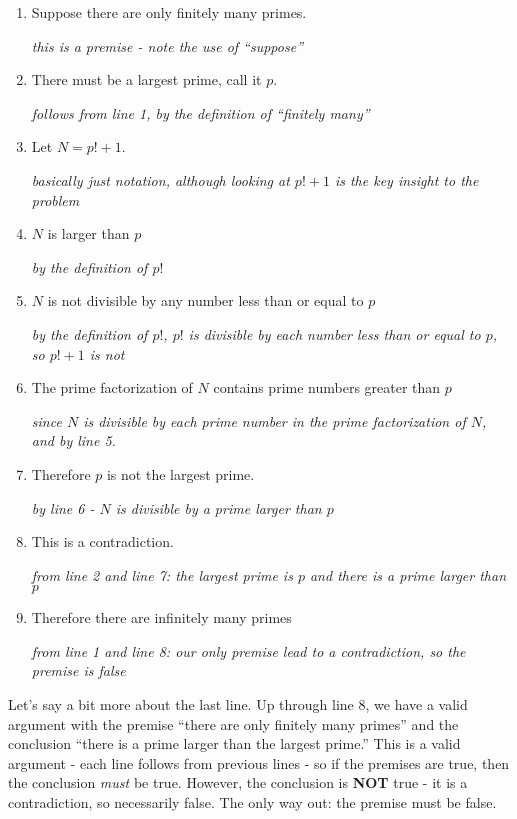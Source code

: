 \begin{enumerate}
 \item Suppose there are only finitely many primes.

\hfill{\em this is a premise - note the use of ``suppose''}
\item  There must be a largest prime, call it $p$. 

\hfill{\em follows from line 1, by the definition of ``finitely many''}
\item Let $N = p! + 1$.

\hfill {\em basically just notation, although looking at $p! + 1$ is the key insight to the problem}
\item $N$ is larger than $p$

\hfill {\em by the definition of $p!$}
\item $N$ is not divisible by any number less than or equal to $p$ 

\hfill {\em by the definition of $p!$, $p!$ is divisible by each number less than or equal to $p$, so $p! + 1$ is not}
\item The prime factorization of $N$ contains prime numbers greater than $p$ 

\hfill {\em since $N$ is divisible by each prime number in the prime factorization of $N$, and by line 5.}
\item Therefore $p$ is not the largest prime.

\hfill {\em by line 6 - $N$ is divisible by a prime larger than $p$}
\item This is a contradiction.

\hfill {\em from line 2 and line 7: the largest prime is $p$ and there is a prime larger than $p$}
\item Therefore there are infinitely many primes

\hfill {\em from line 1 and line 8: our only premise lead to a contradiction, so the premise is false}
\end{enumerate}

Let's say a bit more about the last line.  Up through line 8, we have a valid argument with the premise ``there are only finitely many primes'' and the conclusion ``there is a prime larger than the largest prime.''  This is a valid argument - each line follows from previous lines - so if the premises are true, then the conclusion {\em must} be true.  However, the conclusion is {\bf NOT} true - it is a contradiction, so necessarily false.  The only way out: the premise must be false.  


